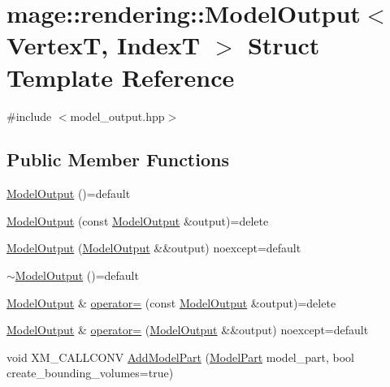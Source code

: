 \hypertarget{structmage_1_1rendering_1_1_model_output}{}\section{mage\+:\+:rendering\+:\+:Model\+Output$<$ VertexT, IndexT $>$ Struct Template Reference}
\label{structmage_1_1rendering_1_1_model_output}


{\ttfamily \#include $<$model\+\_\+output.\+hpp$>$}

\subsection*{Public Member Functions}
\begin{DoxyCompactItemize}
\item 
\hyperlink{structmage_1_1rendering_1_1_model_output_a0aaa7f6abf4c5df03fe02b49ef189e3b}{Model\+Output} ()=default
\item 
\hyperlink{structmage_1_1rendering_1_1_model_output_a52280b5fe47b266e44bf65ea5dcd6752}{Model\+Output} (const \hyperlink{structmage_1_1rendering_1_1_model_output}{Model\+Output} \&output)=delete
\item 
\hyperlink{structmage_1_1rendering_1_1_model_output_a449de2164c45500f02bbe03f4bdc648f}{Model\+Output} (\hyperlink{structmage_1_1rendering_1_1_model_output}{Model\+Output} \&\&output) noexcept=default
\item 
\hyperlink{structmage_1_1rendering_1_1_model_output_a627e604ee86986e4d439244ff734c69c}{$\sim$\+Model\+Output} ()=default
\item 
\hyperlink{structmage_1_1rendering_1_1_model_output}{Model\+Output} \& \hyperlink{structmage_1_1rendering_1_1_model_output_a902ae401740dbcc886b85977efe7c0da}{operator=} (const \hyperlink{structmage_1_1rendering_1_1_model_output}{Model\+Output} \&output)=delete
\item 
\hyperlink{structmage_1_1rendering_1_1_model_output}{Model\+Output} \& \hyperlink{structmage_1_1rendering_1_1_model_output_a10eb65082a0104be36c51cfc613fd156}{operator=} (\hyperlink{structmage_1_1rendering_1_1_model_output}{Model\+Output} \&\&output) noexcept=default
\item 
void X\+M\+\_\+\+C\+A\+L\+L\+C\+O\+NV \hyperlink{structmage_1_1rendering_1_1_model_output_a33512b10fe669c18051a4eac3444f962}{Add\+Model\+Part} (\hyperlink{structmage_1_1rendering_1_1_model_part}{Model\+Part} model\+\_\+part, bool create\+\_\+bounding\+\_\+volumes=true)

\end{DoxyCompactItemize}
